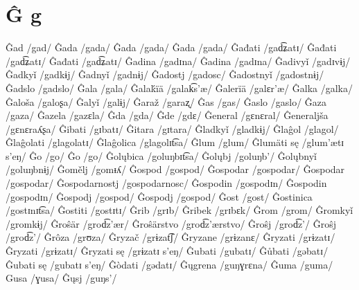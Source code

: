 \chapter{Ĝ g}

Ĝad /gad/
Ĝada /gada/
Ĝada /gada/
Ĝada /gada/
Ĝađati /gad͡ʑatɪ/
Ĝađati /gad͡ʑatɪ/
Ĝađati /gad͡ʑatɪ/
Ĝadina /gadɪna/
Ĝadina /gadɪna/
Ĝadivyǐ /gadɪvɨj/
Ĝadkyǐ /gadkɨj/
Ĝadnyǐ /gadnɨj/
Ĝadostj /gadosc/
Ĝadostnyǐ /gadostnɨj/
Ĝadslo /gadslo/
Ĝala /gala/
Ĝalaḱïä /galak͡s’æ/
Ĝalerïä /galɛr’æ/
Ĝalka /galka/
Ĝaloša /galoʂa/
Ĝalyǐ /galɨj/
Ĝaraž /garaʐ/
Ĝas /gas/
Ĝaslo /gaslo/
Ĝaza /gaza/
Ĝazela /gazɛla/
Ĝda /gda/
Ĝde /gdɛ/
Ĝeneral /gɛnɛral/
Ĝeneraljša /gɛnɛraʎʂa/
Ĝibati /gɪbatɪ/
Ĝitara /gɪtara/
Ĝladkyǐ /gladkɨj/
Ĝlaĝol /glagol/
Ĝlaĝolati /glagolatɪ/
Ĝlaĝolica /glagolɪt͡sa/
Ĝlum /glum/
Ĝlumäti sę /glum’ætɪ s’eŋ/
Ĝo /go/
Ĝo /go/
Ĝolųbica /goluŋbɪt͡sa/
Ĝolųbj /goluŋb’/
Ĝolųbnyǐ /goluŋbnɨj/
Ĝomělj /gomᵻʎ/
Ĝospod /gospod/
Ĝospodar /gospodar/
Ĝospodar /gospodar/
Ĝospodarnostj /gospodarnosc/
Ĝospodin /gospodɪn/
Ĝospodin /gospodɪn/
Ĝospodj /gospod/
Ĝospodj /gospod/
Ĝost /gost/
Ĝostinica /gostɪnɪt͡sa/
Ĝostiti /gostɪtɪ/
Ĝrib /grɪb/
Ĝribek /grɪbɛk/
Ĝrom /grom/
Ĝromkyǐ /gromkɨj/
Ĝroŝär /grod͡z’ær/
Ĝroŝärstvo /grod͡z’ærstvo/
Ĝroŝj /grod͡z’/
Ĝroŝj /grod͡z’/
Ĝrôza /grʊza/
Ĝryzač /grɨzat͡ʃ/
Ĝryzane /grɨzanɛ/
Ĝryzati /grɨzatɪ/
Ĝryzati /grɨzatɪ/
Ĝryzati sę /grɨzatɪ s’eŋ/
Ĝubati /gubatɪ/
Ĝůbati /gəbatɪ/
Ĝubati sę /gubatɪ s’eŋ/
Ĝòdati /gədatɪ/
Ĝųgrena /guŋɣrɛna/
Ĝuma /guma/
Gusa /ɣusa/
Ĝųsj /guŋs’/

